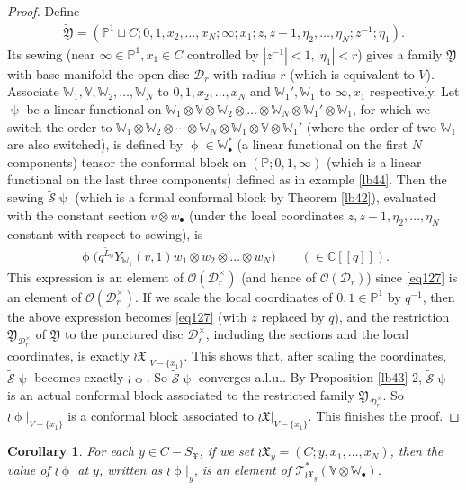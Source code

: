 \documentclass[12pt,b5paper,notitlepage]{report}
\theoremstyle{definition}
\theoremstyle{plain}
\newtheorem{co}[df]{Corollary}
\newcommand{\fk}{\mathfrak}
\newcommand{\mc}{\mathcal}
\newcommand{\wtd}{\widetilde}
\newcommand{\scr}{\mathscr}
\newcommand{\SX}{S_{\fk X}}
\newcommand{\blt}{\bullet}
\newcommand{\Vbb}{\mathbb V}
\newcommand{\Wbb}{\mathbb W}
\newcommand{\Cbb}{\mathbb C}
\newcommand{\Pbb}{\mathbb P}
\numberwithin{equation}{section}
\begin{document}
\begin{proof}
Define
\begin{align*}
\wtd{\fk Y}=(\Pbb^1\sqcup C;0,1,x_2,\dots,x_N;\infty;x_1;z,z-1,\eta_2,\dots,\eta_N;z^{-1};\eta_1).
\end{align*}
Its sewing (near $\infty\in\Pbb^1,x_1\in C$ controlled by $|z^{-1}|<1,|\eta_1|<r$) gives a family $\fk Y$ with base manifold the open disc $\mc D_r$ with radius $r$ (which is equivalent to $V$). Associate $\Wbb_1,\Vbb,\Wbb_2,\dots,\Wbb_N$ to $0,1,x_2,\dots,x_N$ and $\Wbb_1',\Wbb_1$ to $\infty,x_1$ respectively. Let $\uppsi$ be a linear functional on $\Wbb_1\otimes\Vbb\otimes\Wbb_2\otimes\dots\otimes\Wbb_N\otimes \Wbb_1'\otimes \Wbb_1$, for which we switch the order to $\Wbb_1\otimes\Wbb_2\otimes\cdots\otimes\Wbb_N\otimes \Wbb_1\otimes\Vbb\otimes\Wbb_1'$ (where the order of two $\Wbb_1$ are also switched), is defined by $\upphi\in\Wbb_\blt^*$ (a linear functional on the first $N$ components) tensor the conformal block on $(\Pbb;0,1,\infty)$ (which is a linear functional on the last three components) defined as in example \ref{lb44}. Then the sewing $\wtd{\mc S}\uppsi$ (which is a formal conformal block by Theorem \ref{lb42}), evaluated with the constant section $v\otimes w_\blt$ (under the local coordinates $z,z-1,\eta_2,\dots,\eta_N$ constant with respect to sewing), is
\begin{align*}
\upphi\big(q^{\wtd L_0}Y_{\Wbb_1}(v,1)w_1\otimes w_2\otimes \dots\otimes w_N\big)\qquad (\in\Cbb[[q]]).
\end{align*}
This expression is an element of $\scr O(\mc D_r^\times)$ (and hence of $\scr O(\mc D_r)$) since \eqref{eq127} is an element of $\scr O(\mc D_r^\times)$. If we scale the local coordinates of $0,1\in\Pbb^1$ by $q^{-1}$, then the above expression becomes \eqref{eq127} (with $z$ replaced by $q$), and the restriction $\fk Y_{\mc D_r^\times}$ of $\fk Y$ to the punctured disc $\mc D_r^\times$, including the sections and the local coordinates, is exactly  $\wr\fk X|_{V-\{x_1\}}$. This shows that, after scaling the coordinates, $\wtd {\mc S}\uppsi$ becomes exactly $\wr\upphi$. So $\wtd {\mc S}\uppsi$ converges a.l.u..    By Proposition \ref{lb43}-2, $\wtd{\mc S}\uppsi$ is an actual conformal block associated to the restricted family $\fk Y_{\mc D_r^\times}$. So $\wr\upphi|_{V-\{x_1\}}$ is a conformal block associated to $\wr\fk X|_{V-\{x_1\}}$. This finishes the proof. 
\end{proof}



\begin{co}\label{lb127}
For each $y\in C-\SX$, if we set $\wr\fk X_y=(C;y,x_1,\dots,x_N)$, then the value of $\wr\upphi$ at $y$, written as $\wr\upphi|_y$, is an element of $\scr T_{\wr\fk X_y}^*(\Vbb\otimes\Wbb_\blt)$.
\end{co}
\end{document}
